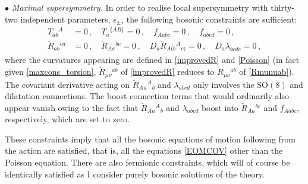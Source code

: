 \documentclass[11pt]{article}
\numberwithin{equation}{section}
\begin{document}
{{\vspace{1em}
\noindent $\bullet$ \emph{Maximal supersymmetry.}
In order to realise local supersymmetry with thirty-two independent parameters, $\epsilon_\pm$, the following bosonic constraints are sufficient:
\begin{subequations}\label{maxcons}%
\begin{align}
 T_{ab}{}^A & = 0 \,,\quad  T_a{}^{\{AB\}} = 0 \,,\quad  f_{Aabc} = 0 \,,\quad  f_{abcd} = 0 \,,
 \label{maxcons_torsion}
 \\[4pt]
\breve{R}_{ab}{}^{cd} &= 0 \,,\quad 
\breve{R}_{Aa}{}^{bc} = 0 \,,\quad 
D_a \breve{R}_{A(b}{}^A{}_{c)} = 0\,,\quad D_a \lambda_{bcde} = 0 \,,
\label{maxcons_curv}
\end{align} 
\end{subequations}
where the curvatures appearing are defined in \eqref{improvedR} and \eqref{Poisson} (in fact given \eqref{maxcons_torsion}, $\breve{R}_{\mu\nu}{}^{ab}$ of \eqref{improvedR} reduces to $R_{\mu\nu}{}^{ab}$ of \eqref{Rmunuab}).
The covariant derivative acting on $\breve{R}_{A}{}_{a}{}^A{}_b$ and $\lambda_{abcd}$ only involves the $\mathrm{SO}(8)$ and dilatation connections. The boost connection terms that would ordinarily also appear vanish owing to the fact that $\breve{R}_{A}{}_{a}{}^A{}_b$ and $\lambda_{abcd}$  boost into $\breve{R}_{Aa}{}^{bc}$ and $f_{Aabc}$, respectively, which are set to zero. 

These constraints imply that all the bosonic equations of motion following from the action are satisfied, that is, all the equations \eqref{EOMCOV} other than the Poisson equation.
There are also fermionic constraints, which will of course be identically satisfied as I consider purely bosonic solutions of the theory.

}}
\end{document}
